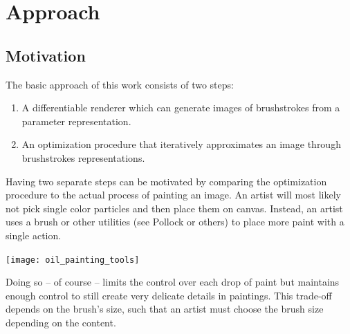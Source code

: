 \setchapterpreamble[u]{\margintoc}
\chapter{Approach}


\section{Motivation}

%
%


The basic approach of this work consists of two steps:
\begin{enumerate}
    \item A differentiable renderer which can generate images of brushstrokes from a parameter representation.
    \item An optimization procedure that iteratively approximates an image through brushstrokes representations.
\end{enumerate}

Having two separate steps can be motivated by comparing the optimization procedure to the actual process of painting an image.
An artist will most likely not pick single color particles and then place them on canvas.
Instead, an artist uses a brush or other utilities (see Pollock or others) to place more paint with a single action.

\begin{marginfigure}
    \texttt{[image: oil\_painting\_tools]}
    \caption[]{A typical set of brushes and spatulas used for oil paintings.
    }
\end{marginfigure}
Doing so -- of course -- limits the control over each drop of paint but maintains enough control to still create very delicate details in paintings.
This trade-off depends on the brush's size, such that an artist must choose the brush size depending on the content.

